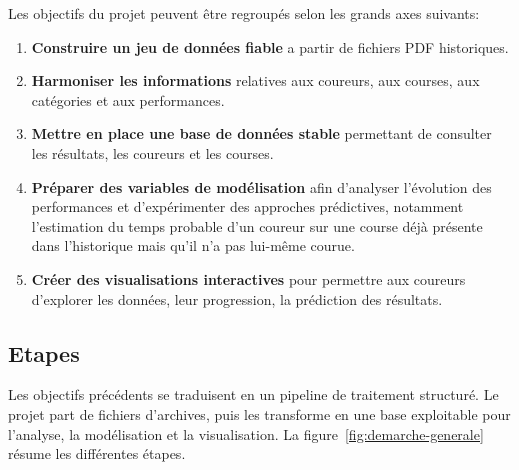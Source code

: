 \documentclass[12pt,a4paper]{article}
\begin{document}
Les objectifs du projet peuvent être regroupés selon les grands axes suivants:

\begin{enumerate}[label=\arabic*.]
    \item \textbf{Construire un jeu de données fiable} a partir de fichiers PDF historiques.
    \item \textbf{Harmoniser les informations} relatives aux coureurs, aux courses, aux catégories et aux performances.
    \item \textbf{Mettre en place une base de données stable} permettant de consulter les résultats, les coureurs et les courses.
    \item \textbf{Préparer des variables de modélisation} afin d'analyser l'évolution des performances et d'expérimenter des approches prédictives, notamment l'estimation du temps probable d'un coureur sur une course déjà présente dans l'historique mais qu'il n'a pas lui-même courue.
    \item \textbf{Créer des visualisations interactives} pour permettre aux coureurs d'explorer les données, leur progression, la prédiction des résultats.
\end{enumerate}

\subsection{Etapes}

Les objectifs précédents se traduisent en un pipeline de traitement structuré. Le projet part de fichiers d'archives, puis les transforme en une base exploitable pour l'analyse, la modélisation et la visualisation. La figure~\ref{fig:demarche-generale} résume les différentes étapes.
\end{document}
